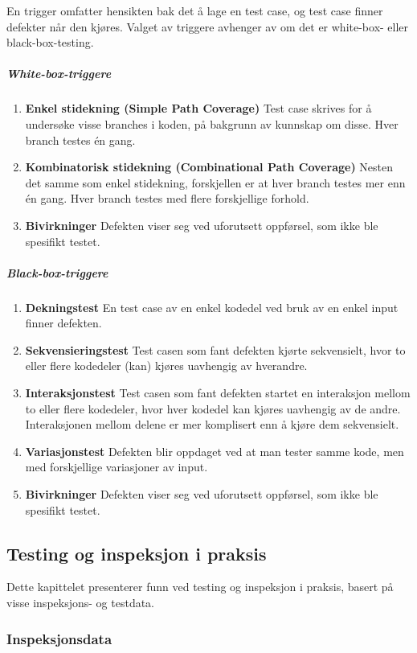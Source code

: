 En trigger omfatter hensikten bak det å lage en test case, og test case
finner defekter når den kjøres. Valget av triggere avhenger av om det er
white-box- eller black-box-testing.

\subparagraph{White-box-triggere}

\begin{enumerate}[1.]
\item
  \textbf{Enkel stidekning (Simple Path Coverage)} Test case skrives for
  å undersøke visse branches i koden, på bakgrunn av kunnskap om disse.
  Hver branch testes én gang.
\item
  \textbf{Kombinatorisk stidekning (Combinational Path Coverage)} Nesten
  det samme som enkel stidekning, forskjellen er at hver branch testes
  mer enn én gang. Hver branch testes med flere forskjellige forhold.
\item
  \textbf{Bivirkninger} Defekten viser seg ved uforutsett oppførsel, som
  ikke ble spesifikt testet.
\end{enumerate}
\subparagraph{Black-box-triggere}

\begin{enumerate}[1.]
\item
  \textbf{Dekningstest} En test case av en enkel kodedel ved bruk av en
  enkel input finner defekten.
\item
  \textbf{Sekvensieringstest} Test casen som fant defekten kjørte
  sekvensielt, hvor to eller flere kodedeler (kan) kjøres uavhengig av
  hverandre.
\item
  \textbf{Interaksjonstest} Test casen som fant defekten startet en
  interaksjon mellom to eller flere kodedeler, hvor hver kodedel kan
  kjøres uavhengig av de andre. Interaksjonen mellom delene er mer
  komplisert enn å kjøre dem sekvensielt.
\item
  \textbf{Variasjonstest} Defekten blir oppdaget ved at man tester samme
  kode, men med forskjellige variasjoner av input.
\item
  \textbf{Bivirkninger} Defekten viser seg ved uforutsett oppførsel, som
  ikke ble spesifikt testet.
\end{enumerate}
\subsection{Testing og inspeksjon i praksis}

Dette kapittelet presenterer funn ved testing og inspeksjon i praksis,
basert på visse inspeksjons- og testdata.

\subsubsection{Inspeksjonsdata}

